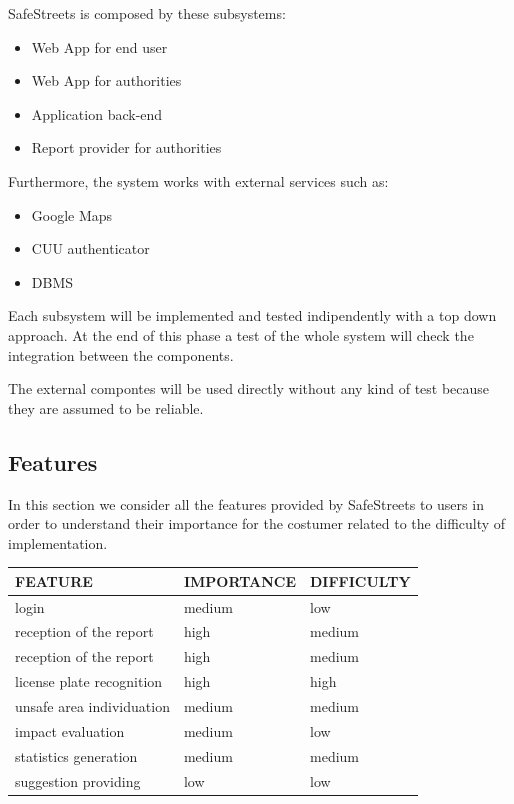 SafeStreets is composed by these subsystems:
\begin{itemize}
	\item 
	Web App for end user
	\item 
	Web App for authorities
	\item 
	Application back-end
	\item 
	Report provider for authorities
\end{itemize}
Furthermore, the system works with external services such as:
\begin{itemize}
	\item 
	Google Maps 
	\item 
	CUU authenticator
	\item 
	DBMS
\end{itemize}

Each subsystem will be implemented and tested indipendently with a top down approach. At the end of this phase a test of the whole system will check the integration between the components. 

The external compontes will be used directly without any kind of test because they are assumed to be reliable.

\subsection{Features}

In this section we consider all the features provided by SafeStreets to users in order to understand their importance for the costumer related to the difficulty of implementation.

\begin{center}
	\begin{tabular}{ | p{6cm} | p{3.5cm} |p{3cm}|} 
		\hline
		FEATURE & IMPORTANCE & DIFFICULTY  \\ 
		\hline
		login & medium & low  \\ 
		\hline
		reception of the report  & high & medium  \\ 
		\hline
		reception of the report  & high & medium  \\ 
		\hline
		license plate recognition & high & high \\ 
		\hline
		unsafe area individuation & medium & medium \\ 
		\hline
		impact evaluation & medium & low \\ 
		\hline
		statistics generation & medium & medium \\ 
		\hline
		suggestion providing & low & low \\ 
		\hline
	\end{tabular}
\end{center}

